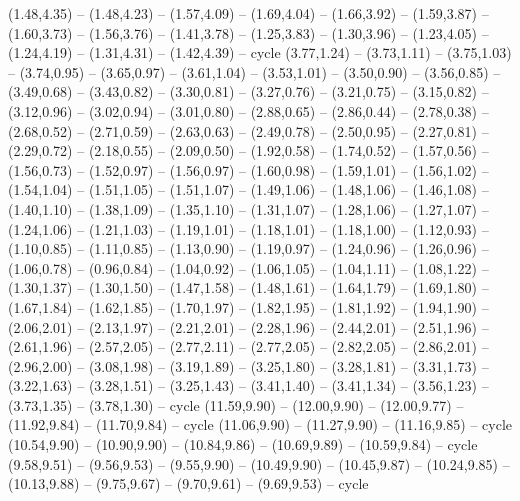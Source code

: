 \expandafter\def\csname geo:gebiet:1938-Luxembourg\endcsname{
  (1.48,4.35) -- (1.48,4.23) -- (1.57,4.09) -- (1.69,4.04) -- (1.66,3.92) -- (1.59,3.87) -- (1.60,3.73) -- (1.56,3.76) -- (1.41,3.78) -- (1.25,3.83) -- (1.30,3.96) -- (1.23,4.05) -- (1.24,4.19) -- (1.31,4.31) -- (1.42,4.39) -- cycle}
\expandafter\def\csname geo:gebiet:1938-Switzerland\endcsname{
  (3.77,1.24) -- (3.73,1.11) -- (3.75,1.03) -- (3.74,0.95) -- (3.65,0.97) -- (3.61,1.04) -- (3.53,1.01) -- (3.50,0.90) -- (3.56,0.85) -- (3.49,0.68) -- (3.43,0.82) -- (3.30,0.81) -- (3.27,0.76) -- (3.21,0.75) -- (3.15,0.82) -- (3.12,0.96) -- (3.02,0.94) -- (3.01,0.80) -- (2.88,0.65) -- (2.86,0.44) -- (2.78,0.38) -- (2.68,0.52) -- (2.71,0.59) -- (2.63,0.63) -- (2.49,0.78) -- (2.50,0.95) -- (2.27,0.81) -- (2.29,0.72) -- (2.18,0.55) -- (2.09,0.50) -- (1.92,0.58) -- (1.74,0.52) -- (1.57,0.56) -- (1.56,0.73) -- (1.52,0.97) -- (1.56,0.97) -- (1.60,0.98) -- (1.59,1.01) -- (1.56,1.02) -- (1.54,1.04) -- (1.51,1.05) -- (1.51,1.07) -- (1.49,1.06) -- (1.48,1.06) -- (1.46,1.08) -- (1.40,1.10) -- (1.38,1.09) -- (1.35,1.10) -- (1.31,1.07) -- (1.28,1.06) -- (1.27,1.07) -- (1.24,1.06) -- (1.21,1.03) -- (1.19,1.01) -- (1.18,1.01) -- (1.18,1.00) -- (1.12,0.93) -- (1.10,0.85) -- (1.11,0.85) -- (1.13,0.90) -- (1.19,0.97) -- (1.24,0.96) -- (1.26,0.96) -- (1.06,0.78) -- (0.96,0.84) -- (1.04,0.92) -- (1.06,1.05) -- (1.04,1.11) -- (1.08,1.22) -- (1.30,1.37) -- (1.30,1.50) -- (1.47,1.58) -- (1.48,1.61) -- (1.64,1.79) -- (1.69,1.80) -- (1.67,1.84) -- (1.62,1.85) -- (1.70,1.97) -- (1.82,1.95) -- (1.81,1.92) -- (1.94,1.90) -- (2.06,2.01) -- (2.13,1.97) -- (2.21,2.01) -- (2.28,1.96) -- (2.44,2.01) -- (2.51,1.96) -- (2.61,1.96) -- (2.57,2.05) -- (2.77,2.11) -- (2.77,2.05) -- (2.82,2.05) -- (2.86,2.01) -- (2.96,2.00) -- (3.08,1.98) -- (3.19,1.89) -- (3.25,1.80) -- (3.28,1.81) -- (3.31,1.73) -- (3.22,1.63) -- (3.28,1.51) -- (3.25,1.43) -- (3.41,1.40) -- (3.41,1.34) -- (3.56,1.23) -- (3.73,1.35) -- (3.78,1.30) -- cycle}
\expandafter\def\csname geo:gebiet:1938-Latvia\endcsname{
  (11.59,9.90) -- (12.00,9.90) -- (12.00,9.77) -- (11.92,9.84) -- (11.70,9.84) -- cycle
  (11.06,9.90) -- (11.27,9.90) -- (11.16,9.85) -- cycle
  (10.54,9.90) -- (10.90,9.90) -- (10.84,9.86) -- (10.69,9.89) -- (10.59,9.84) -- cycle
  (9.58,9.51) -- (9.56,9.53) -- (9.55,9.90) -- (10.49,9.90) -- (10.45,9.87) -- (10.24,9.85) -- (10.13,9.88) -- (9.75,9.67) -- (9.70,9.61) -- (9.69,9.53) -- cycle}
